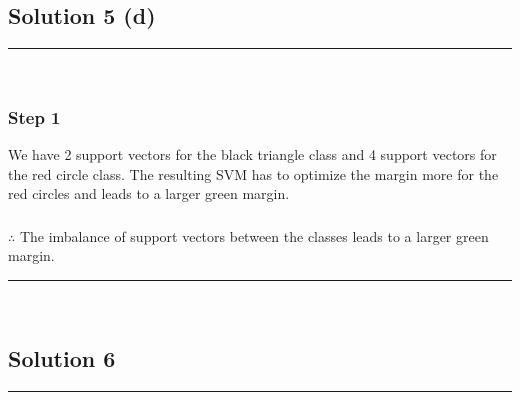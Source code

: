 \documentclass{article}
\begin{document}
\newpage

\subsection*{Solution 5 (d)}
\noindent\rule{\textwidth}{0.4pt}\\

\subsubsection*{Step 1}
\parbox{\textwidth}{
We have 2 support vectors for the black triangle class and 4 support vectors for the red circle class.
The resulting SVM has to optimize the margin more for the red circles and leads to a larger green margin.
}

\subsubsection*{\normalfont}{$\therefore$ The imbalance of support vectors between the classes leads to a larger green margin.}

\noindent\rule{\textwidth}{0.4pt}\\

\newpage

\subsection*{Solution 6}
\noindent\rule{\textwidth}{0.4pt}\\
\end{document}
